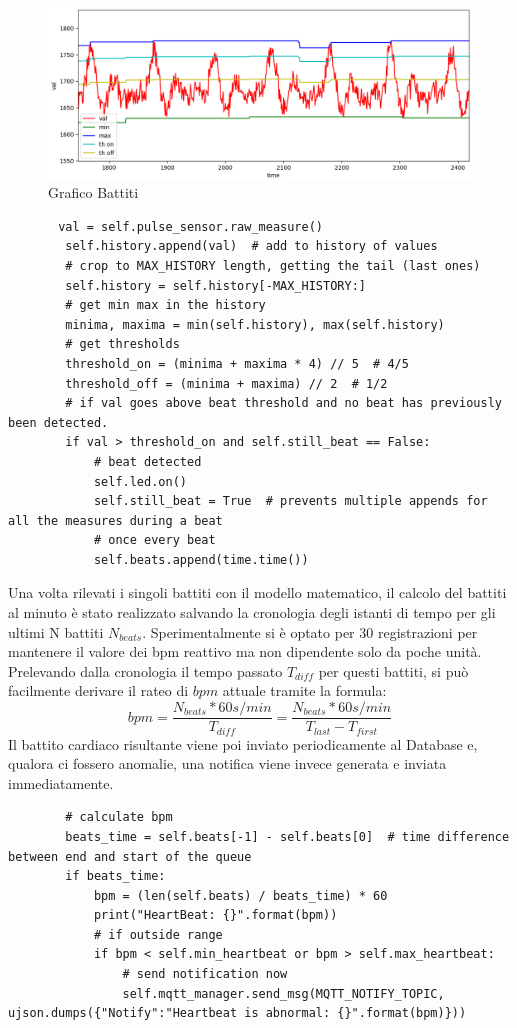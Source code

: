     \begin{figure}[H]
        \caption{Grafico Battiti}
        \label{fig:Heartbeat}
        \centering
        \includegraphics[width=1\textwidth]{Images/heartbeatGraph.png}
    \end{figure}
    \begin{lstlisting}
       val = self.pulse_sensor.raw_measure()
        self.history.append(val)  # add to history of values
        # crop to MAX_HISTORY length, getting the tail (last ones)
        self.history = self.history[-MAX_HISTORY:]
        # get min max in the history
        minima, maxima = min(self.history), max(self.history)
        # get thresholds
        threshold_on = (minima + maxima * 4) // 5  # 4/5
        threshold_off = (minima + maxima) // 2  # 1/2
        # if val goes above beat threshold and no beat has previously been detected.
        if val > threshold_on and self.still_beat == False:
            # beat detected
            self.led.on()
            self.still_beat = True  # prevents multiple appends for all the measures during a beat
            # once every beat
            self.beats.append(time.time())
    \end{lstlisting}

Una volta rilevati i singoli battiti con il modello matematico, il calcolo del battiti al minuto è stato realizzato salvando la cronologia degli istanti di tempo per gli ultimi N battiti $N_{beats}$. Sperimentalmente si è optato per 30 registrazioni per mantenere il valore dei bpm reattivo ma non dipendente solo da poche unità. Prelevando dalla cronologia il tempo passato $T_{diff}$ per questi battiti, si può facilmente derivare il rateo di $bpm$ attuale tramite la formula: 
\begin{equation}
bpm = \frac{ N_{beats}*60 s/min }{T_{diff}} = \frac{ N_{beats}*60 s/min }{T_{last}-T_{first}} 
\end{equation}
Il battito cardiaco risultante viene poi inviato periodicamente al Database e, qualora ci fossero anomalie, una notifica viene invece generata e inviata immediatamente.
    \begin{lstlisting}
        # calculate bpm
        beats_time = self.beats[-1] - self.beats[0]  # time difference between end and start of the queue
        if beats_time:
            bpm = (len(self.beats) / beats_time) * 60
            print("HeartBeat: {}".format(bpm))
            # if outside range
            if bpm < self.min_heartbeat or bpm > self.max_heartbeat:
                # send notification now
                self.mqtt_manager.send_msg(MQTT_NOTIFY_TOPIC, ujson.dumps({"Notify":"Heartbeat is abnormal: {}".format(bpm)}))
    \end{lstlisting}

